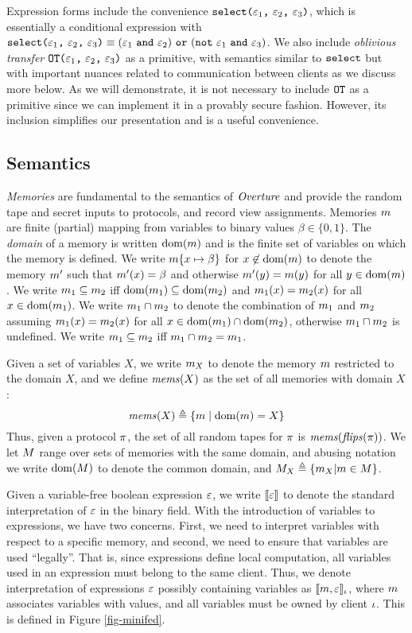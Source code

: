 Expression forms include the convenience
$\texttt{select(} \varepsilon_1 \texttt{,}\ \varepsilon_2 \texttt{,}\ \varepsilon_3 \texttt{)}$, which is essentially a conditional
expression with
$
\select{\be_1}{\be_2}{\be_3} \equiv (\be_1\ \eand\ \be_2)\ \eor\ (\enot\ \be_1\ \eand\ \be_3)
$.
We also include \emph{oblivious transfer} $\texttt{OT(} \varepsilon_1 \texttt{,}\ \varepsilon_2 \texttt{,}\ \varepsilon_3 \texttt{)}$ as a primitive,
with semantics similar to $\texttt{select}$ but with important nuances
related to communication between clients as we discuss more below.
As we will demonstrate, it is not necessary to include $\texttt{OT}$
as a primitive since we can implement it in a provably secure
fashion. However, its inclusion simplifies our presentation and is a useful
convenience.

\subsection{Semantics}

\emph{Memories} are fundamental to the semantics of $\mathit{Overture}$ and
provide the random tape and secret inputs to protocols, and record
view assignments. Memories $m$ are finite (partial) mapping from
variables to binary values $\beta \in \{0,1\}$. The \emph{domain} of a
memory is written $\mathrm{dom}(m)$ and is the finite set of variables on
which the memory is defined. We write $m\{ x \mapsto \beta\}$ for
$x\not\in\mathrm{dom}(m)$ to denote the memory $m'$ such that
$m'(x) = \beta$ and otherwise $m'(y) = m(y)$ for all $y
\in \mathrm{dom}(m)$. We write $m_1 \subseteq m_2$ iff
$\mathrm{dom}(m_1) \subseteq \mathrm{dom}(m_2)$ and $m_1(x) =
m_2(x)$ for all $x \in \mathrm{dom}(m_1)$. We write $m_1 \cap
m_2$ to denote the combination of $m_1$ and $m_2$
assuming $m_1(x) = m_2(x)$ for all $x \in \mathrm{dom}(m_1)
\cap \mathrm{dom}(m_2)$, otherwise $m_1 \cap m_2$ is undefined.
We write $m_1 \subseteq m_2$ iff $m_1 \cap m_2
= m_1$.

Given a set of variables $X$, we write $m_X$ to denote the
memory $m$ restricted to the domain $X$, and we define
$\mathit{mems}(X)$ as the set of all memories with domain $X$:
$$
\mathit{mems}(X) \triangleq \{ m \mid \mathrm{dom}(m) = X \}
$$
Thus, given a protocol $\pi$, the set of all random tapes for
$\pi$ is $\mathit{mems}(\mathit{flips}(\pi))$. We let $M$ range
over sets of memories with the same domain, and abusing notation
we write $\mathrm{dom}(M)$ to denote the common domain,
and $M_X \triangleq \{ m_X | m \in M \}$.

Given a variable-free boolean expression $\varepsilon$, we write $\llbracket \varepsilon \rrbracket$
to denote the standard interpretation of $\varepsilon$ in the binary field.
With the introduction of variables to expressions, we have two
concerns. First, we need to interpret variables with respect to a
specific memory, and second, we need to ensure that variables are used
``legally''. That is, since expressions define local computation, all
variables used in an expression must belong to the same client.  Thus,
we denote interpretation of expressions $\varepsilon$ possibly containing
variables as $\llbracket m,\varepsilon \rrbracket_{\iota}$, where $m$ associates
variables with values, and all variables must be owned by client
$\iota$. This is defined in Figure \ref{fig-minifed}.

